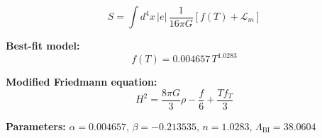 
\begin{equation}
  S = \int d^4x \, |e| \, \frac{1}{16\pi G} \left[ f(T) + \mathcal{L}_m \right]
\end{equation}

\textbf{Best-fit model:}
\begin{equation}
  f(T) = 0.004657 \, T^{1.0283}
\end{equation}

\textbf{Modified Friedmann equation:}
\begin{equation}
  H^2 = \frac{8\pi G}{3} \rho - \frac{f}{6} + \frac{T f_T}{3}
\end{equation}

\textbf{Parameters:}
$\alpha = 0.004657$, \quad
$\beta = -0.213535$, \quad
$n = 1.0283$, \quad
$\Lambda_{\text{BI}} = 38.0604$
